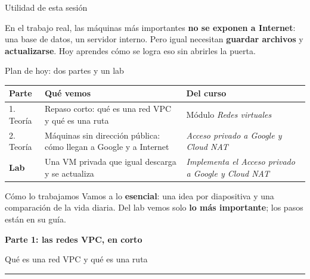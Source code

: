 \documentclass[aspectratio=169,10pt,c]{beamer}
\newcommand{\separador}[2]{%
\begin{frame}[plain]
\vfill
\begin{center}
{\fontsize{29}{34}\selectfont\bfseries #1}\par
\vspace{2mm}
{\small #2}\par
\vspace{4mm}
{\color{utpRojo}\rule{8.5cm}{1.2pt}}
\end{center}
\vfill
\end{frame}}
\begin{document}
\begin{frame}[c]{Utilidad de esta sesión}
\begin{center}
\begin{minipage}{.86\textwidth}
{\large En el trabajo real, las máquinas más importantes \textbf{no se exponen a Internet}: una base de datos, un servidor interno. Pero igual necesitan \textbf{guardar archivos} y \textbf{actualizarse}. Hoy aprendes cómo se logra eso sin abrirles la puerta.}
\end{minipage}
\end{center}
\end{frame}

\begin{frame}{Plan de hoy: dos partes y un lab}
\renewcommand{\arraystretch}{1.35}
\centering\small
\begin{tabular}{@{}p{1.4cm}>{\raggedright\arraybackslash}p{6.4cm}>{\raggedright\arraybackslash}p{5.1cm}@{}}
\toprule
\textbf{Parte} & \textbf{Qué vemos} & \textbf{Del curso}\\
\midrule
1. Teoría & Repaso corto: qué es una red VPC y qué es una ruta & Módulo \emph{Redes virtuales}\\
2. Teoría & Máquinas sin dirección pública: cómo llegan a Google y a Internet & \emph{Acceso privado a Google y Cloud NAT}\\
\textbf{Lab} & Una VM privada que igual descarga y se actualiza & \emph{Implementa el Acceso privado a Google y Cloud NAT}\\
\bottomrule
\end{tabular}
\par\vspace{3mm}
\begin{alertblock}{Cómo lo trabajamos}
\small Vamos a lo \textbf{esencial}: una idea por diapositiva y una comparación de la vida diaria. Del lab vemos solo \textbf{lo más importante}; los pasos están en su guía.
\end{alertblock}
\end{frame}

\separador{Parte 1: las redes VPC, en corto}{Qué es una red VPC y qué es una ruta}
\end{document}
